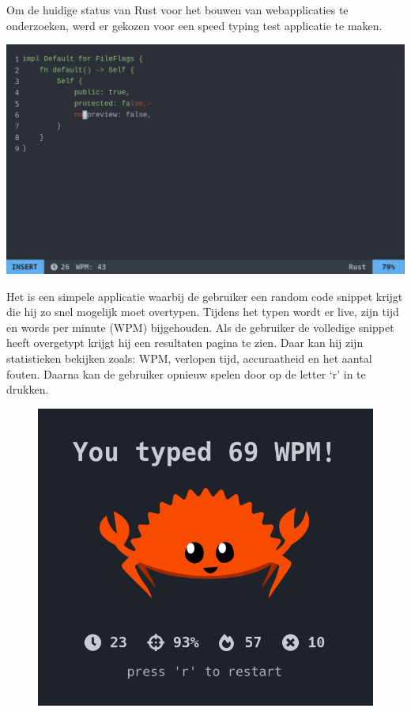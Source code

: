 Om de huidige status van Rust voor het bouwen van webapplicaties te onderzoeken, werd er gekozen
voor een speed typing test applicatie te maken.

\includegraphics[width=\textwidth]{./figures/vim.png}

Het is een simpele applicatie waarbij de gebruiker een random code snippet krijgt die hij zo snel
mogelijk moet overtypen. Tijdens het typen wordt er live, zijn tijd en words per minute (WPM)
bijgehouden. Als de gebruiker de volledige snippet heeft overgetypt krijgt hij een resultaten pagina
te zien. Daar kan hij zijn statistieken bekijken zoals: WPM, verlopen tijd, accuraatheid en het
aantal fouten. Daarna kan de gebruiker opnieuw spelen door op de letter ‘r’ in te drukken. \\
\begin{figure}
  \centering
  \includegraphics[width=0.9\linewidth]{./figures/result.png}
\end{figure}


